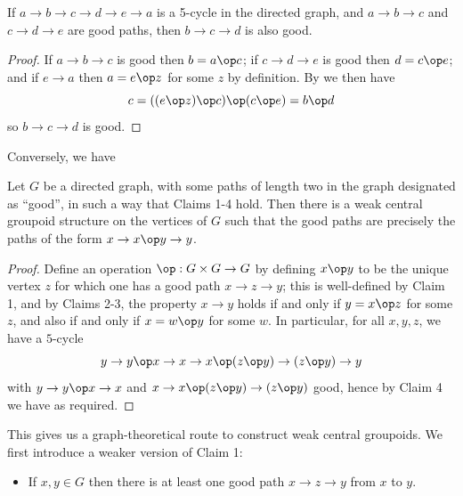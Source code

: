 \begin{lemma}[Claim 4]\label{claim-4}\leanok{}
  If $a \to b \to c \to d \to e \to a$ is a 5-cycle in the directed graph, and $a \to b \to c$ and $c \to d \to e$ are good paths, then $b \to c \to d$ is also good.
\end{lemma}

\begin{proof}
  If $a \to b \to c$ is good then $b = a \op c$; if $c \to d \to e$ is good then $d = c \op e$; and if $e \to a$ then $a = e \op z$ for some $z$ by definition. By  we then have
  $$ c = ((e \op z) \op c) \op (c \op e) = b \op d$$
  so $b \to c \to d$ is good.
\end{proof}

Conversely, we have

\begin{lemma}\label{rev-claim}\leanok{}
  Let $G$ be a directed graph, with some paths of length two in the graph designated as ``good'', in such a way that Claims 1-4 hold. Then there is a weak central groupoid structure on the vertices of $G$ such that the good paths are precisely the paths of the form $x \to x \op y \to y$.
\end{lemma}

\begin{proof}
  Define an operation $\op: G \times G \to G$ by defining $x \op y$ to be the unique vertex $z$ for which one has a good path $x \to z \to y$; this is well-defined by Claim 1, and by Claims 2-3, the property $x \to y$ holds if and only if $y = x \op z$ for some $z$, and also if and only if $x = w \op y$ for some $w$. In particular, for all $x,y,z$, we have a $5$-cycle
  $$ y \to y \op x \to x \to x \op (z \op y) \to (z \op y) \to y$$
  with $y \to y \op x \to x$ and $x \to x \op (z \op y) \to (z \op y)$ good, hence by Claim 4 we have  as required.
\end{proof}

This gives us a graph-theoretical route to construct weak central groupoids. We first introduce a weaker version of Claim 1:

\begin{itemize}
  \item[Claim 1':] If $x,y \in G$ then there is at least one good path $x \to z \to y$ from $x$ to $y$.
\end{itemize}


